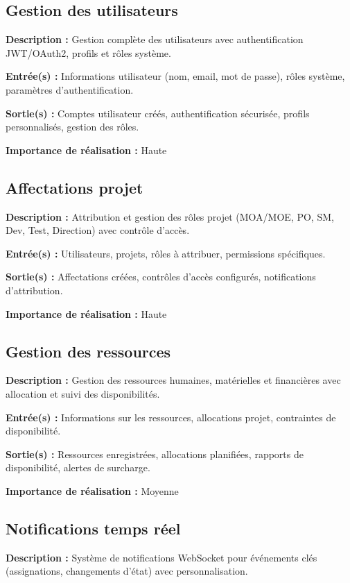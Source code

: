 \subsection{Gestion des utilisateurs}
\textbf{Description :} Gestion complète des utilisateurs avec authentification JWT/OAuth2, profils et rôles système.

\textbf{Entrée(s) :} Informations utilisateur (nom, email, mot de passe), rôles système, paramètres d'authentification.

\textbf{Sortie(s) :} Comptes utilisateur créés, authentification sécurisée, profils personnalisés, gestion des rôles.

\textbf{Importance de réalisation :} Haute

\subsection{Affectations projet}
\textbf{Description :} Attribution et gestion des rôles projet (MOA/MOE, PO, SM, Dev, Test, Direction) avec contrôle d'accès.

\textbf{Entrée(s) :} Utilisateurs, projets, rôles à attribuer, permissions spécifiques.

\textbf{Sortie(s) :} Affectations créées, contrôles d'accès configurés, notifications d'attribution.

\textbf{Importance de réalisation :} Haute

\subsection{Gestion des ressources}
\textbf{Description :} Gestion des ressources humaines, matérielles et financières avec allocation et suivi des disponibilités.

\textbf{Entrée(s) :} Informations sur les ressources, allocations projet, contraintes de disponibilité.

\textbf{Sortie(s) :} Ressources enregistrées, allocations planifiées, rapports de disponibilité, alertes de surcharge.

\textbf{Importance de réalisation :} Moyenne

\subsection{Notifications temps réel}
\textbf{Description :} Système de notifications WebSocket pour événements clés (assignations, changements d'état) avec personnalisation.

